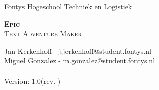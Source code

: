 
\begin{titlepage}

Fontys Hogeschool Techniek en Logistiek

\begin{center}

\vspace*{1.5in}

\textsc{\LARGE \textbf{Epic} }\\[1.5cm]

\textsc{\Large Text Adventure Maker}\\[0.5cm]

\vspace*{1in}
\vspace*{2.6in}

{\footnotesize
Jan Kerkenhoff - j.jerkenhoff@student.fontys.nl\\
Miguel Gonzalez - m.gonzalez@student.fontys.nl\\
\thedate\\

Version: 1.0\hspace{5pt}(rev. \svnrev)
}

\end{center}

\end{titlepage}


